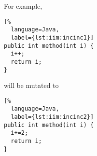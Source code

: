 For example, \newline
\begin{lstlisting}[%
  language=Java,
  label={lst:iim:incinc1}]
public int method(int i) {
  i++;
  return i;
}
\end{lstlisting}

will be mutated to \newline

\begin{lstlisting}[%
  language=Java,
  label={lst:iim:incinc2}]
public int method(int i) {
  i+=2;
  return i;
}
\end{lstlisting}

